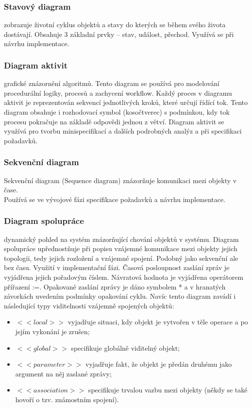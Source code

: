 \documentclass[10pt,a4paper]{article}
\begin{document}
\subsubsection{Stavový diagram}
zobrazuje životní cyklus objektů a stavy do kterých se během svého života dostávají. Obsahuje 3 základní prvky – stav, událost, přechod. Využívá se při návrhu implementace. 
\subsubsection{Diagram aktivit}
grafické znázornění algoritmů. Tento diagram se používá pro modelování procedurální logiky, procesů a zachycení workflow. Každý proces v diagramu aktivit je reprezentován sekvencí jednotlivých kroků, které určují řídící tok. Tento diagram obsahuje i rozhodovací symbol (kosočtverec) s podmínkou, kdy tok procesu pokračuje na základě odpovědi jednou z větví.
Diagram aktivit se využívá pro tvorbu minispecifikací a dalších podrobných analýz a při specifikaci požadavků.
\subsubsection{Sekvenční diagram}
Sekvenční diagram (Sequence diagram) znázorňuje komunikaci mezi objekty v čase.\\
Používá se ve vývojové fázi specifikace požadavků a návrhu implementace.
\subsubsection{Diagram spolupráce} 
dynamický pohled na systém znázorňující chování objektů v systému. Diagram spolupráce upřednostňuje při popisu vzájemné komunikace mezi objekty jejich topologii, tedy jejich rozložení a vzájemné spojení. Podobný jako sekvenční ale bez času. Využití  v implementační fázi.
Časová posloupnost zaslání zpráv je vyjádřena jejich pořadovým číslem. Návratová hodnota je vyjádřena operátorem přířazení :=. Opakované zaslání zprávy je dáno symbolem * a v hranatých závorkách uvedením podmínky opakování cyklu. Navíc tento diagram zavádí i následující typy viditelnosti vzájemně spojených objektů: 
\begin{itemize}
\item $<<local>>$ vyjadřuje situaci, kdy objekt je vytvořen v těle operace a po jejím vykonání je zrušen; 
\item $<<global>>$ specifikuje globálně viditelný objekt; 
\item $<<parameter>>$ vyjadřuje fakt, že objekt je předán druhému jako argument na něj zaslané zprávy; 
\item $<<association>>$ specifikuje trvalou vazbu mezi objekty (někdy se také hovoří o tzv. známostním spojení).
\end{itemize}
\end{document}
